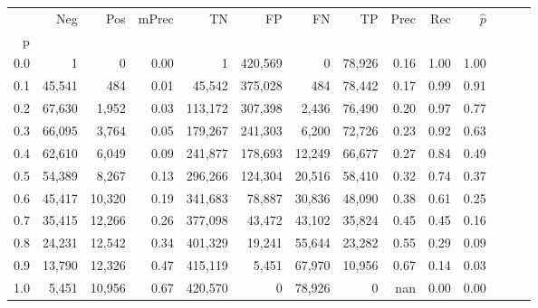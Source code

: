 \begin{tabular}{rrrrrrrrrrrrrr}
\toprule
{} &     Neg &     Pos & mPrec &       TN &       FP &      FN &      TP &  Prec &   Rec & $\hat{p}$ \\
p   &         &         &       &          &          &         &         &       &       &           \\
\midrule
0.0 &       1 &       0 &  0.00 &        1 &  420,569 &       0 &  78,926 &  0.16 &  1.00 &      1.00 \\
0.1 &  45,541 &     484 &  0.01 &   45,542 &  375,028 &     484 &  78,442 &  0.17 &  0.99 &      0.91 \\
0.2 &  67,630 &   1,952 &  0.03 &  113,172 &  307,398 &   2,436 &  76,490 &  0.20 &  0.97 &      0.77 \\
0.3 &  66,095 &   3,764 &  0.05 &  179,267 &  241,303 &   6,200 &  72,726 &  0.23 &  0.92 &      0.63 \\
0.4 &  62,610 &   6,049 &  0.09 &  241,877 &  178,693 &  12,249 &  66,677 &  0.27 &  0.84 &      0.49 \\
0.5 &  54,389 &   8,267 &  0.13 &  296,266 &  124,304 &  20,516 &  58,410 &  0.32 &  0.74 &      0.37 \\
0.6 &  45,417 &  10,320 &  0.19 &  341,683 &   78,887 &  30,836 &  48,090 &  0.38 &  0.61 &      0.25 \\
0.7 &  35,415 &  12,266 &  0.26 &  377,098 &   43,472 &  43,102 &  35,824 &  0.45 &  0.45 &      0.16 \\
0.8 &  24,231 &  12,542 &  0.34 &  401,329 &   19,241 &  55,644 &  23,282 &  0.55 &  0.29 &      0.09 \\
0.9 &  13,790 &  12,326 &  0.47 &  415,119 &    5,451 &  67,970 &  10,956 &  0.67 &  0.14 &      0.03 \\
1.0 &   5,451 &  10,956 &  0.67 &  420,570 &        0 &  78,926 &       0 &   nan &  0.00 &      0.00 \\
\bottomrule
\end{tabular}
